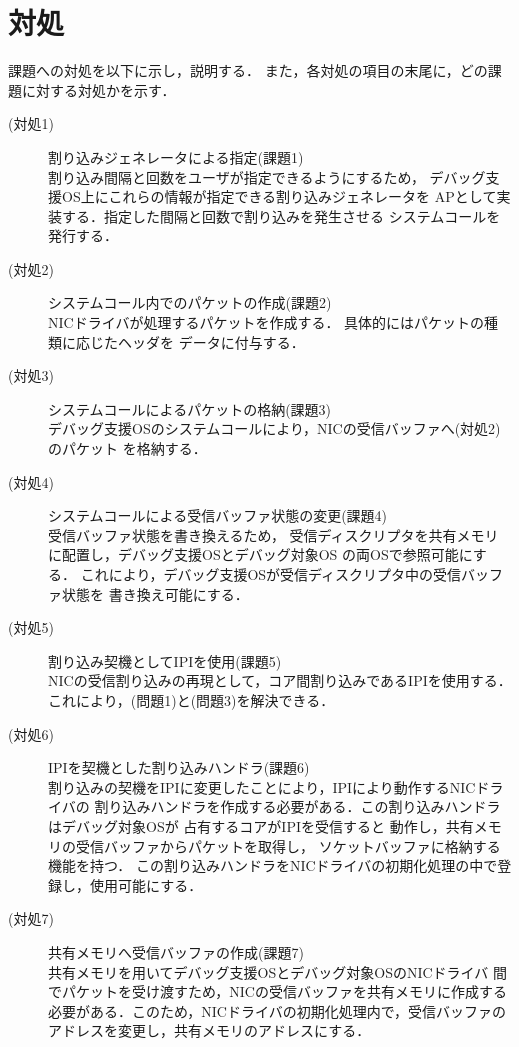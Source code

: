 \documentclass[tanilab-enum]{graduate}
\begin{document}
\section{対処}\label{taisyo}
課題への対処を以下に示し，説明する．
また，各対処の項目の末尾に，どの課題に対する対処かを示す．
\begin{description}
    \item[(対処1)] 割り込みジェネレータによる指定(課題1)\\
        割り込み間隔と回数をユーザが指定できるようにするため，
        デバッグ支援OS上にこれらの情報が指定できる割り込みジェネレータを
        APとして実装する．指定した間隔と回数で割り込みを発生させる
        システムコールを発行する．
    \item[(対処2)] システムコール内でのパケットの作成(課題2)\\
        NICドライバが処理するパケットを作成する．
        具体的にはパケットの種類に応じたヘッダを
        データに付与する．
    \item[(対処3)] システムコールによるパケットの格納(課題3)\\
        デバッグ支援OSのシステムコールにより，NICの受信バッファへ(対処2)のパケット
        を格納する．
    \item[(対処4)] システムコールによる受信バッファ状態の変更(課題4)\\
        受信バッファ状態を書き換えるため，
        受信ディスクリプタを共有メモリに配置し，デバッグ支援OSとデバッグ対象OS
        の両OSで参照可能にする．
        これにより，デバッグ支援OSが受信ディスクリプタ中の受信バッファ状態を
        書き換え可能にする．
    \item[(対処5)] 割り込み契機としてIPIを使用(課題5)\\
        NICの受信割り込みの再現として，コア間割り込みであるIPIを使用する．
        これにより，(問題1)と(問題3)を解決できる．
    \item[(対処6)] IPIを契機とした割り込みハンドラ(課題6)\\
        割り込みの契機をIPIに変更したことにより，IPIにより動作するNICドライバの
        割り込みハンドラを作成する必要がある．この割り込みハンドラはデバッグ対象OSが
        占有するコアがIPIを受信すると
        動作し，共有メモリの受信バッファからパケットを取得し，
        ソケットバッファに格納する機能を持つ．
        この割り込みハンドラをNICドライバの初期化処理の中で登録し，使用可能にする．
    \item[(対処7)] 共有メモリへ受信バッファの作成(課題7)\\
        共有メモリを用いてデバッグ支援OSとデバッグ対象OSのNICドライバ
        間でパケットを受け渡すため，NICの受信バッファを共有メモリに作成する
        必要がある．このため，NICドライバの初期化処理内で，受信バッファの
        アドレスを変更し，共有メモリのアドレスにする．

\end{description}
\end{document}
